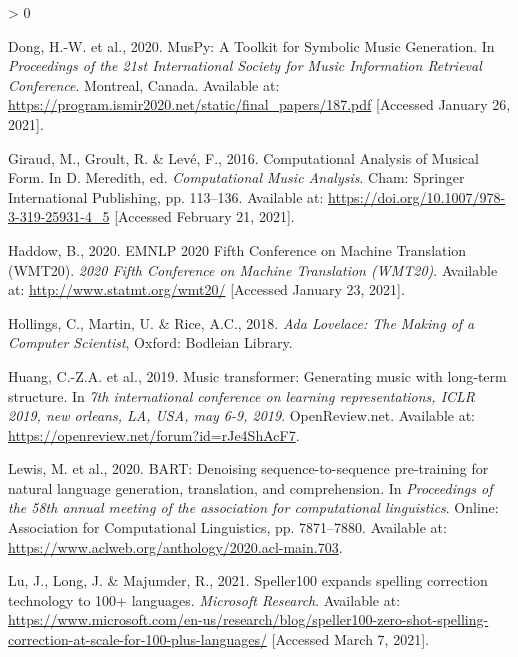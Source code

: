 \documentclass[12pt,a4paper,]{report}
\newlength{\cslhangindent}
\newenvironment{CSLReferences}[2] %
 {%
  \setlength{\parindent}{0pt}
  \ifodd #1 \everypar{\setlength{\hangindent}{\cslhangindent}}\ignorespaces\fi
  \ifnum #2 > 0
  \setlength{\parskip}{#2\baselineskip}
  \fi
 }%
 {}
\begin{document}
\begin{CSLReferences}{1}{0}
\leavevmode\hypertarget{ref-dong_muspy_2020}{}%
Dong, H.-W. et al., 2020. {MusPy}: {A} {Toolkit} for {Symbolic} {Music}
{Generation}. In \emph{Proceedings of the 21st {International} {Society}
for {Music} {Information} {Retrieval} {Conference}}. Montreal, Canada.
Available at:
\url{https://program.ismir2020.net/static/final_papers/187.pdf}
{[}Accessed January 26, 2021{]}.

\leavevmode\hypertarget{ref-giraud_computational_2016}{}%
Giraud, M., Groult, R. \& Levé, F., 2016. Computational {Analysis} of
{Musical} {Form}. In D. Meredith, ed. \emph{Computational {Music}
{Analysis}}. Cham: Springer International Publishing, pp. 113--136.
Available at: \url{https://doi.org/10.1007/978-3-319-25931-4_5}
{[}Accessed February 21, 2021{]}.

\leavevmode\hypertarget{ref-haddow_wmt_2020}{}%
Haddow, B., 2020. {EMNLP} 2020 {Fifth} {Conference} on {Machine}
{Translation} ({WMT20}). \emph{2020 Fifth Conference on Machine
Translation (WMT20)}. Available at: \url{http://www.statmt.org/wmt20/}
{[}Accessed January 23, 2021{]}.

\leavevmode\hypertarget{ref-hollings_ada_2018}{}%
Hollings, C., Martin, U. \& Rice, A.C., 2018. \emph{Ada {Lovelace}:
{The} {Making} of a {Computer} {Scientist}}, Oxford: Bodleian Library.

\leavevmode\hypertarget{ref-huang_music_2019}{}%
Huang, C.-Z.A. et al., 2019. Music transformer: Generating music with
long-term structure. In \emph{7th international conference on learning
representations, {ICLR} 2019, new orleans, LA, USA, may 6-9, 2019}.
OpenReview.net. Available at:
\url{https://openreview.net/forum?id=rJe4ShAcF7}.

\leavevmode\hypertarget{ref-lewis_bart_2020}{}%
Lewis, M. et al., 2020. {BART}: Denoising sequence-to-sequence
pre-training for natural language generation, translation, and
comprehension. In \emph{Proceedings of the 58th annual meeting of the
association for computational linguistics}. Online: Association for
Computational Linguistics, pp. 7871--7880. Available at:
\url{https://www.aclweb.org/anthology/2020.acl-main.703}.

\leavevmode\hypertarget{ref-lu_speller100_2021}{}%
Lu, J., Long, J. \& Majumder, R., 2021. Speller100 expands spelling
correction technology to 100+ languages. \emph{Microsoft Research}.
Available at:
\url{https://www.microsoft.com/en-us/research/blog/speller100-zero-shot-spelling-correction-at-scale-for-100-plus-languages/}
{[}Accessed March 7, 2021{]}.


\end{CSLReferences}
\end{document}
